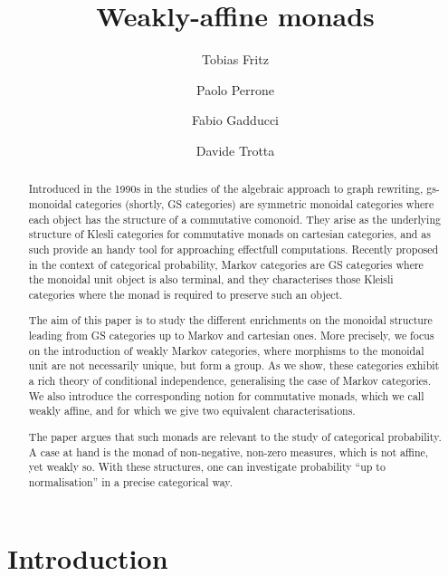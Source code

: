 \documentclass[a4paper,UKenglish,numberwithinsect,cleveref, autoref, thm-restate]{lipics-v2021}
\title{Weakly-affine monads}
\author{Tobias Fritz}{Department of Mathematics, University of Innsbruck, AT}{tobias.fritz@uibk.ac.at}{}{}
\author{Paolo Perrone}{Department of Computer Science, University of Oxford, UK}{paolo.perrone@cs.ox.ac.uk}{https://orcid.org/0000-0002-9123-9089}{}
\author{Fabio Gadducci}{Department of Computer Science, University of Pisa, Pisa, IT}{fabio.gadducci@unipi.it}{https://orcid.org/
0000-0003-0690-3051}{}
\author{ Davide Trotta }{Department of Computer Science, University of Pisa, Pisa, IT}{trottadavide92@gmail.com}{https://orcid.org/0000-0003-4509-594X}{}
\theoremstyle{plain} %
\theoremstyle{definition} %
\begin{document}
\maketitle


\begin{abstract}
   Introduced in the 1990s in the studies of the algebraic approach to graph rewriting, 
   gs-monoidal categories (shortly, GS categories) are symmetric monoidal categories 
   where each object has the structure of a commutative comonoid. They arise as the 
   underlying structure of Klesli categories for commutative monads on cartesian categories, 
   and as such provide an handy tool for approaching effectfull computations. 
   Recently proposed in the context of categorical probability, Markov categories are
   GS categories where the monoidal unit object is also terminal, and they characterises 
   those Kleisli categories where the monad is required to preserve such an object.

   The aim of this paper is to study the different enrichments on the monoidal structure 
   leading from GS categories up to Markov and cartesian ones. More precisely, we 
   focus on the introduction of weakly Markov categories, where morphisms to the monoidal 
   unit are not necessarily unique, but form a group. As we show, these categories exhibit a 
   rich theory of conditional 
   independence, generalising the case of Markov categories. We also introduce the corresponding 
   notion for commutative monads, which we call weakly affine, and for which we give two equivalent
   characterisations.

   The paper argues that such monads are relevant to the study of categorical probability.
   A case at hand is the monad of non-negative, non-zero measures, which is not affine, 
   yet weakly so. With these structures, one can investigate probability 
   ``up to normalisation'' in a precise categorical way.
\end{abstract}

\section{Introduction}
\end{document}
